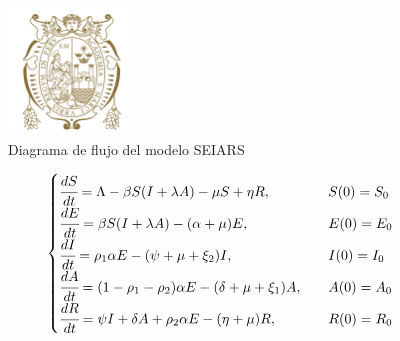 \begin{figure}[H]
    \centering
    \includegraphics[width=0.3\textwidth]{include/logo.png}
    \caption{Diagrama de flujo del modelo SEIARS}
    \label{fig:SEIARS_model} %
\end{figure}

\[
\begin{cases}
    \cfrac{dS}{dt} =\Lambda - \beta S(I+\lambda A) - \mu S + \eta R, \quad&S(0)=S_0\\
    \cfrac{dE}{dt} =\beta S(I+\lambda A) - (\alpha + \mu)E, \quad&E(0)=E_0 \\
    \cfrac{dI}{dt} =\rho_1\alpha E - (\psi+\mu+\xi_2)I, \quad&I(0)=I_0 \\
    \cfrac{dA}{dt} =(1-\rho_1-\rho_2)\alpha E - (\delta+\mu+\xi_1)A, \quad&A(0)=A_0 \\
    \cfrac{dR}{dt} =\psi I + \delta A+\rho_2\alpha E - (\eta+\mu)R, \quad&R(0)=R_0 \\
\end{cases}
\]

